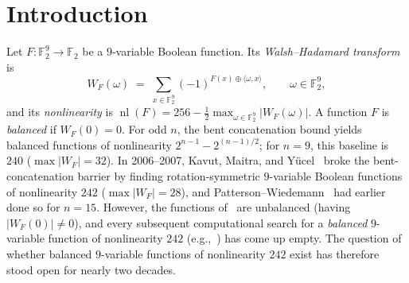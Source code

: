 \documentclass[11pt]{article}
\theoremstyle{definition}
\newcommand{\F}{\mathbb{F}}
\newcommand{\nl}{\operatorname{nl}}
\newcommand{\code}[1]{{\ttfamily\small\renewcommand{\_}{\textunderscore\allowbreak}#1}}
\begin{document}
\begin{abstract}
At $t=114,116$, the final $k=16$ residual is closed by \textbf{three independent routes}: (i) a direct eight-variable $\mathrm{AG}(6,2)$ enumeration of all $16$-point dual geometries and their low complements (\code{nl242\_endpoint\_closure.zip}), (ii) a separate $\mathrm{RM}(3,5)$ codimension-$1$ code-lift cross-check scoring all $70$ admissible lifts (\code{nl242\_endpoint\_crosscheck.zip}), and (iii) a full independent re-verification of $\rho(1,9) < 244$ over all $349$ Brier--Langevin cubic classes following Wang, Lou, and Wang~\cite{WLW2026} (\code{nl244\_verify.zip}, Section~\ref{sec:nl244}).
Together, these yield an unconditional computer-assisted proof that $\nl_{\mathrm{bal}}(9)=240$.
This is a computer-assisted proof: its correctness includes the correctness of our code, and all of that code is published with the paper.
\end{abstract}

\tableofcontents

\section{Introduction}
\label{sec:intro}

Let $F : \F_2^9 \to \F_2$ be a $9$-variable Boolean function. Its \emph{Walsh--Hadamard transform} is
\[
  W_F(\omega) \;=\; \sum_{x \in \F_2^9} (-1)^{F(x) \oplus \langle \omega, x \rangle}, \qquad \omega \in \F_2^9,
\]
and its \emph{nonlinearity} is $\nl(F) = 256 - \frac{1}{2}\max_{\omega \in \F_2^9} |W_F(\omega)|$.
A function $F$ is \emph{balanced} if $W_F(0) = 0$.
For odd $n$, the bent concatenation bound yields balanced functions of nonlinearity $2^{n-1} - 2^{(n-1)/2}$; for $n = 9$, this baseline is $240$ ($\max |W_F| = 32$).
In 2006--2007, Kavut, Maitra, and Y\"ucel~\cite{KMY2006,KMY2007} broke the bent-concatenation barrier by finding rotation-symmetric $9$-variable Boolean functions of nonlinearity $242$ ($\max |W_F| = 28$), and Patterson--Wiedemann~\cite{PW1983} had earlier done so for $n = 15$.
However, the functions of~\cite{KMY2007} are unbalanced (having $|W_F(0)| \neq 0$), and every subsequent computational search for a \emph{balanced} $9$-variable function of nonlinearity $242$ (e.g.,~\cite{KY2010,Carlet2021}) has come up empty.
The question of whether balanced $9$-variable functions of nonlinearity $242$ exist has therefore stood open for nearly two decades.
\end{document}
